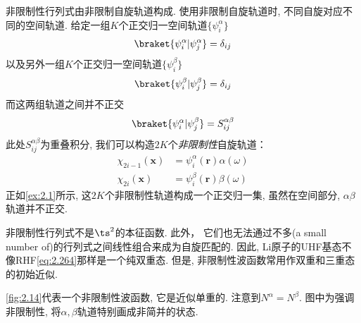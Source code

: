 非限制性行列式由非限制自旋轨道构成. 
使用非限制自旋轨道时, 
不同自旋对应不同的空间轨道. 
给定一组$K$个正交归一空间轨道$\{\psi_i^\alpha\}$
\begin{align}
\braket{\psi_i^\alpha|\psi_j^\alpha}=\delta_{ij}
\end{align}
以及另外一组$K$个正交归一空间轨道$\{\psi_i^\beta\}$
\begin{align}
\braket{\psi_i^\beta|\psi_j^\beta}=\delta_{ij}
\end{align}
而这两组轨道之间并不正交
\begin{align}
\braket{\psi_i^\alpha|\psi_j^\beta}=S_{ij}^{\alpha\beta}
\end{align}
此处$S_{ij}^{\alpha\beta}$为重叠积分, 
我们可以构造$2K$个\emph{非限制性}自旋轨道：
\begin{equation}
\begin{split}
\chi_{2i-1}(\mathbf{x}) &= \psi_i^\alpha(\mathbf{r})\alpha(\omega)\\
\chi_{2i}(\mathbf{x})   &= \psi_i^\beta(\mathbf{r})\beta(\omega) 
\end{split}
\end{equation}
正如\autoref{ex:2.1}所示, 
这$2K$个非限制性轨道构成一个正交归一集, 
虽然在空间部分, 
$\alpha$$\beta$轨道并不正交.


非限制性行列式不是$\ts^2$的本征函数. 
此外， 
它们也无法通过不多(a small number of)的行列式之间线性组合来成为自旋匹配的. 
因此, 
Li原子的UHF基态不像RHF\autoref{eq:2.264}那样是一个纯双重态. 
但是, 
非限制性波函数常用作双重和三重态的初始近似. 


\autoref{fig:2.14}代表一个非限制性波函数, 
它是近似单重的. 
注意到$N^\alpha = N^\beta$. 
图中为强调非限制性, 
将$\alpha,\beta$轨道特别画成非简并的状态.

